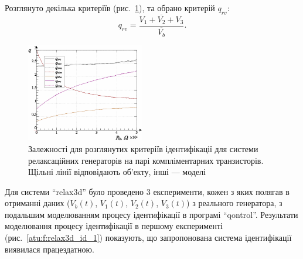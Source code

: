 \documentclass[a4paper,13pt]{atuaref}
\begin{document}
Розглянуто декілька критеріїв (рис.~\ref{atu:f:relax3d_q}), та обрано критерій $q_{rv}$:
%
\begin{equation}
  q_{rv} = \frac{\overline{V_1+V_2+V_3}}{\overline{V_b}}.
  \label{atu:eq:q_rv_relax}
\end{equation}

\begin{figure}[htb!]
  \vspace{-1.6ex}
  \centerline{\includegraphics[width=0.46\textwidth]{p7/p/relax3d_read_q-p_q1_xl.png} }
  \vspace{-1.2ex}
  \caption{Залежності для розглянутих критеріїв ідентифікації для системи
  релаксаційних генераторів на парі компліментарних транзисторів.
  Щільні лінії відповідають об'екту, інші --- моделі}
  \label{atu:f:relax3d_q}
\end{figure}

Для системи ``relax3d'' було проведено 3 експерименти,
кожен з яких полягав в отриманні даних
($V_b(t)$, $V_1(t)$, $V_2(t)$, $V_3(t)$)
з реального генератора, з подальшим моделюванням процесу ідентифікації в
програмі ``qontrol''.
Результати моделювання процесу ідентифікації в першому експерименті
(рис.~\ref{atu:f:relax3d_id_1}) показують, що запропонована система
ідентифікації виявилася працездатною.
\end{document}
